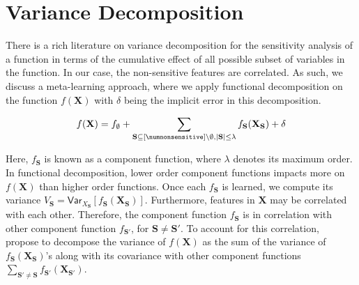 \begin{comment}
Next, we relate SP with the difference in \red{variances} of the classifier by substituting $ \mathbf{a} $ as $ \mathbf{a}_{\max} $ and $ \mathbf{a'} $ as $ \mathbf{a}_{\min} $. 

\begin{align*}
\text{Statistical parity }= p_{\mathbf{a}_{\max}} -  p_{\mathbf{a}_{\min}}  = \frac{	\mathsf{Var}[B_{\mathbf{a}_{\max}}] - \mathsf{Var}[B_{\mathbf{a}_{\min}}]}{1 - (p_{\mathbf{a}_{\max}} + p_{\mathbf{a}_{\min}})}
\end{align*}


Thus, statistical parity can be distributed to all subset of features in $ \nonsensitive \cup \sensitive $ based on variance decomposition. We observe that computing the variance for all possible subsets of features is computationally expensive and in practice one may look into only first and second-order \red{variances}. 

\end{comment}


\section{Variance Decomposition}
There is a rich literature on variance decomposition for the sensitivity analysis of a function in terms of the cumulative effect of all possible subset of variables in the function. In our case, the non-sensitive features are correlated. As such, we discuss a meta-learning approach, where we apply functional decomposition on the function $ f(\mathbf{X}) $ with $ \delta $ being the implicit error in this decomposition.

\begin{align*}
f(\mathbf{X}) = f_{\emptyset} +  \sum_{\mathbf{S} \subseteq [\numnonsensitive] \setminus \emptyset, |\mathbf{S}| \le \lambda} f_{\mathbf{S}}(\mathbf{X}_{\mathbf{S}}) + \delta
\end{align*}

Here, $ f_{\mathbf{S}} $ is known as a component function, where $ \lambda $ denotes its maximum order. In functional decomposition, lower order component functions impacts more on $ f(\mathbf{X}) $ than higher order functions. Once each $ f_{\mathbf{S}} $ is learned, we compute its variance $ V_{\mathbf{S}}  = \mathsf{Var}_{X_{\mathbf{S}}}[f_{\mathbf{S}}(\mathbf{X}_{\mathbf{S}})]$. Furthermore, features in $ \mathbf{X} $ may be correlated with each other. Therefore, the component function $ f_{\mathbf{S}} $ is in correlation with other component function $ f_{\mathbf{S}'} $, for $ \mathbf{S} \ne \mathbf{S}' $. To account for this correlation,~\cite{li2010global} propose to decompose the variance of $ f(\mathbf{X}) $ as the sum of the variance of $ f_{\mathbf{S}}(\mathbf{X}_{\mathbf{S}}) $'s along with its covariance with other component functions $ \sum_{\mathbf{S}' \ne \mathbf{S}} f_{\mathbf{S'}}(\mathbf{X}_{\mathbf{S}'}) $.


